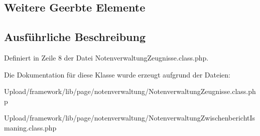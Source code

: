 \subsection*{Weitere Geerbte Elemente}


\subsection{Ausführliche Beschreibung}


Definiert in Zeile 8 der Datei Notenverwaltung\+Zeugnisse.\+class.\+php.



Die Dokumentation für diese Klasse wurde erzeugt aufgrund der Dateien\+:\begin{DoxyCompactItemize}
\item 
Upload/framework/lib/page/notenverwaltung/Notenverwaltung\+Zeugnisse.\+class.\+php\item 
Upload/framework/lib/page/notenverwaltung/Notenverwaltung\+Zwischenbericht\+Ismaning.\+class.\+php\end{DoxyCompactItemize}
